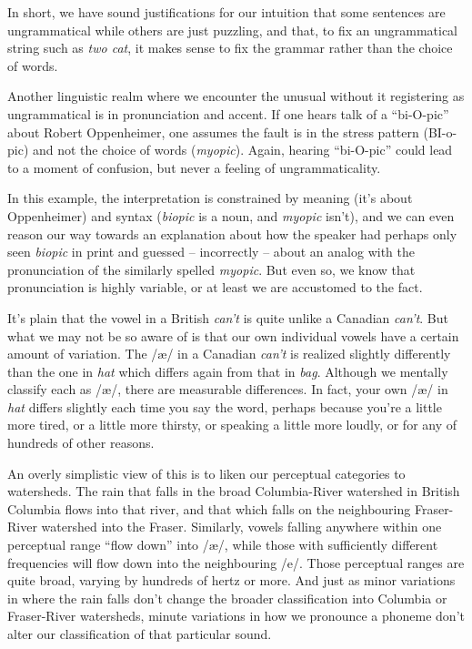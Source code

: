 In short, we have sound justifications for our intuition that some sentences are ungrammatical while others are just puzzling, and that, to fix an ungrammatical string such as \textit{two cat}, it makes sense to fix the grammar rather than the choice of words. 

\bigskip

Another linguistic realm where we encounter the unusual without it registering as ungrammatical is in pronunciation and accent. If one hears talk of a ``bi-O-pic'' about Robert Oppenheimer, one assumes the fault is in the stress pattern (BI-o-pic) and not the choice of words (\textit{myopic}). Again, hearing ``bi-O-pic'' could lead to a moment of confusion, but never a feeling of ungrammaticality.

In this example, the interpretation is constrained by meaning (it's about Oppenheimer) and syntax (\textit{biopic} is a noun, and \textit{myopic} isn't), and we can even reason our way towards an explanation about how the speaker had perhaps only seen \textit{biopic} in print and guessed -- incorrectly -- about an analog with the pronunciation of the similarly spelled \textit{myopic}. But even so, we know that pronunciation is highly variable, or at least we are accustomed to the fact.

It's plain that the vowel in a British \textit{can't} is quite unlike a Canadian \textit{can't}. But what we may not be so aware of is that our own individual vowels have a certain amount of variation. The /æ/ in a Canadian \textit{can't} is realized slightly differently than the one in \textit{hat} which differs again from that in \textit{bag}. Although we mentally classify each as /æ/, there are measurable differences. In fact, your own /æ/ in \textit{hat} differs slightly each time you say the word, perhaps because you're a little more tired, or a little more thirsty, or speaking a little more loudly, or for any of hundreds of other reasons.

An overly simplistic view of this is to liken our perceptual categories to watersheds. The rain that falls in the broad Columbia-River watershed in British Columbia flows into that river, and that which falls on the neighbouring Fraser-River watershed into the Fraser. Similarly, vowels falling anywhere within one perceptual range ``flow down'' into /æ/, while those with sufficiently different frequencies will flow down into the neighbouring /e/. Those perceptual ranges are quite broad, varying by hundreds of hertz or more. And just as minor variations in where the rain falls don't change the broader classification into Columbia or Fraser-River watersheds,  minute variations in how we pronounce a phoneme don't alter our classification of that particular sound.

